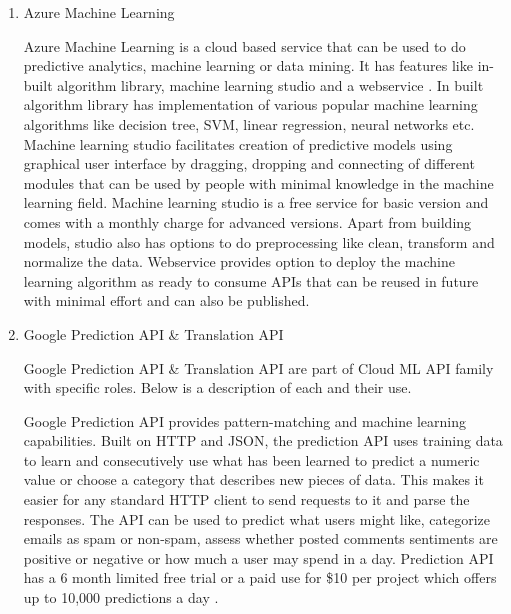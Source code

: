 \begin{enumerate}
\item {} 
Azure Machine Learning

Azure Machine Learning is a cloud based service that can be used
to do predictive analytics, machine learning or data mining. It
has features like in-built algorithm library, machine learning
studio and a webservice \label{\detokenize{i524/technologies:id87}}{\hyperref[\detokenize{i524/technologies:www-azuremlsite}]{\sphinxcrossref{{[}78{]}}}}. In built
algorithm library has implementation of various popular machine
learning algorithms like decision tree, SVM, linear regression,
neural networks etc. Machine learning studio facilitates creation
of predictive models using graphical user interface by dragging,
dropping and connecting of different modules that can be used by
people with minimal knowledge in the machine learning
field. Machine learning studio is a free service for basic version
and comes with a monthly charge for advanced versions. Apart from
building models, studio also has options to do preprocessing like
clean, transform and normalize the data. Webservice provides
option to deploy the machine learning algorithm as ready to
consume APIs that can be reused in future with minimal effort and
can also be published.

\item {} 
Google Prediction API \& Translation API

Google Prediction API \& Translation API are part of Cloud ML API
family with specific roles. Below is a description of each and
their use.

Google Prediction API provides pattern-matching and machine
learning capabilities. Built on HTTP and JSON, the prediction API
uses training data to learn and consecutively use what has been
learned to predict a numeric value or choose a category that
describes new pieces of data. This makes it easier for any
standard HTTP client to send requests to it and parse the
responses. The API can be used to predict what users might like,
categorize emails as spam or non-spam, assess whether posted
comments sentiments are positive or negative or how much a user
may spend in a day. Prediction API has a 6 month limited free
trial or a paid use for \$10 per project which offers up to 10,000
predictions a day \label{\detokenize{i524/technologies:id88}}{\hyperref[\detokenize{i524/technologies:www-prediction}]{\sphinxcrossref{{[}79{]}}}}.


\end{enumerate}
